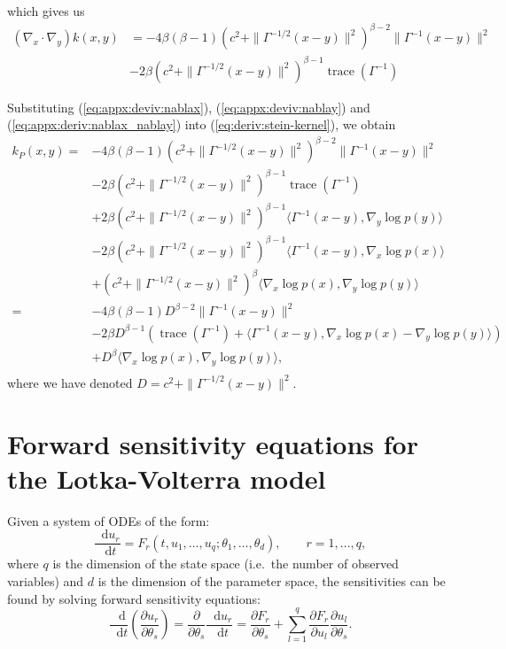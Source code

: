 \documentclass[11pt,a4paper]{report}
\newcommand*\diff{\mathop{}\!\mathrm{d}}
\DeclareMathOperator{\trace}{trace}
\begin{document}
which gives us
\begin{equation}
\begin{aligned}
(\nabla_x \cdot \nabla_y) k(x,y) 
&= -4 \beta(\beta-1) \left(c^2 + \| \Gamma^{-1/2}(x-y)\|^2\right)^{\beta-2} \| \Gamma^{-1}(x - y)\|^2 \\
&- 2\beta \left(c^2 + \|\Gamma^{-1/2}(x-y)\|^2\right)^{\beta-1} \trace(\Gamma^{-1})
\label{eq:appx:deriv:nablax_nablay}
\end{aligned}
\end{equation}

Substituting (\ref{eq:appx:deviv:nablax}), (\ref{eq:appx:deviv:nablay}) and (\ref{eq:appx:deriv:nablax_nablay}) into (\ref{eq:deriv:stein-kernel}), we obtain
\begin{equation}
\begin{aligned}
k_P(x, y)
= &-4 \beta(\beta-1) \left(c^2 + \| \Gamma^{-1/2}(x-y)\|^2\right)^{\beta-2} \| \Gamma^{-1}(x - y)\|^2 \\
&- 2\beta \left(c^2 + \|\Gamma^{-1/2}(x-y)\|^2\right)^{\beta-1} \trace(\Gamma^{-1}) \\
&+ 2 \beta \left(c^2 + \| \Gamma^{-1/2} (x-y)\|^2\right)^{\beta-1} \langle \Gamma^{-1} (x - y), \nabla_y \log p(y)\rangle \\
&- 2 \beta \left(c^2 + \| \Gamma^{-1/2} (x-y)\|^2\right)^{\beta-1} \langle \Gamma^{-1} (x - y), \nabla_x \log p(x)\rangle \\
&+ \left(c^2 + \| \Gamma^{-1/2} (x-y)\|^2\right)^\beta \langle \nabla_x \log p(x), \nabla_y \log p(y) \rangle \\
= &-4 \beta(\beta-1) D^{\beta-2} \| \Gamma^{-1}(x - y)\|^2  \\
&- 2 \beta D^{\beta-1} (\trace(\Gamma^{-1}) + \langle \Gamma^{-1} (x - y), \nabla_x \log p(x) - \nabla_y \log p(y)\rangle) \\
&+ D^\beta \langle \nabla_x \log p(x), \nabla_y \log p(y) \rangle, \\
\end{aligned}
\label{eq:k_P:IMQ}
\end{equation}
where we have denoted $D = c^2 + \| \Gamma^{-1/2}(x-y)\|^2$.

\section{Forward sensitivity equations for the Lotka-Volterra model}
\label{appendix:derivations:forward-sensitivity}

Given a system of ODEs of the form:
$$\frac{\diff u_r}{\diff t} = F_r(t, u_1, \dots, u_q; \theta_1, \dots, \theta_d),\qquad r=1,\dots,q,$$
where $q$ is the dimension of the state space (i.e.\ the number of observed variables) and $d$ is the dimension of the parameter space,
the sensitivities can be found by solving forward sensitivity equations:
$$\frac{\diff}{\diff t}\left(\frac{\partial u_r}{\partial \theta_s}\right)
= \frac{\partial}{\partial \theta_s}\frac{\diff u_r}{\diff t} 
= \frac{\partial F_r}{\partial \theta_s} + \sum_{l=1}^q \frac{\partial F_r}{\partial u_l} \frac{\partial u_l}{\partial \theta_s}.$$
\end{document}
